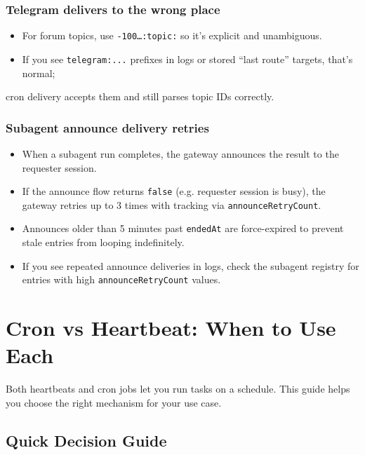 \subsubsection{Telegram delivers to the wrong place}


\begin{itemize}
  \item For forum topics, use \texttt{-100…:topic:} so it’s explicit and unambiguous.
  \item If you see \texttt{telegram:...} prefixes in logs or stored “last route” targets, that’s normal;
\end{itemize}

cron delivery accepts them and still parses topic IDs correctly.

\subsubsection{Subagent announce delivery retries}


\begin{itemize}
  \item When a subagent run completes, the gateway announces the result to the requester session.
  \item If the announce flow returns \texttt{false} (e.g. requester session is busy), the gateway retries up to 3 times with tracking via \texttt{announceRetryCount}.
  \item Announces older than 5 minutes past \texttt{endedAt} are force-expired to prevent stale entries from looping indefinitely.
  \item If you see repeated announce deliveries in logs, check the subagent registry for entries with high \texttt{announceRetryCount} values.
\end{itemize}



\clearpage

\section{Cron vs Heartbeat: When to Use Each}


Both heartbeats and cron jobs let you run tasks on a schedule. This guide helps you choose the right mechanism for your use case.

\subsection{Quick Decision Guide}



